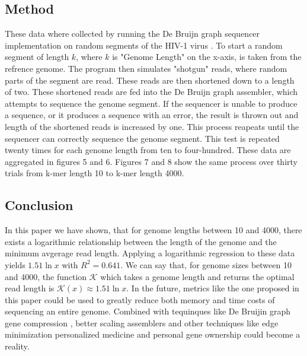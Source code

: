 \documentclass[letterpaper, 10 pt]{ieeeconf}
\begin{document}
  \subsection{Method}
  These data where collected by running the De Bruijn graph sequencer
  implementation on random segments of the HIV-1 virus \cite{ncbi.nlm.nih.gov}.
  To start a random segment of length $k$, where $k$ is "Genome Length" on the
  x-axis, is taken from the refrence genome.  The program then simulates
  "shotgun" reads, where random parts of the segment are read.  These reads are
  then shortened down to a length of two.  These shortened reads are fed into
  the De Bruijn graph assembler, which attempts to sequence the genome segment.
  If the sequencer is unable to produce a sequence, or it produces a sequence
  with an error, the result is thrown out and length of the shortened reads is
  increased by one.  This process reapeats until the sequencer can correctly
  sequence the genome segment.  This test is repeated twenty times for each
  genome length from ten to four-hundred.  These data are aggregated in figures
  5 and 6.  Figures 7 and 8 show the same
  process over thirty trials from k-mer length 10 to k-mer length 4000.

  \subsection{Conclusion}
  In this paper we have shown, that for genome lengths between 10 and 4000,
  there exists a logarithmic relationship between the length of the genome and the
  minimum avgerage read length.  Applying a logarithmic regression to these data yields
  $1.51\ln{x}$ with $R^2 = 0.641$.  We can say that, for genome sizes between 10 and 4000,
  the function $\mathcal{K}$ which takes a genome length and returns the optimal read
  length is $\mathcal{K}(x) \approx 1.51 \ln{x}$.  In the future, metrics like the one
  proposed in this paper could be used to greatly reduce both memory and time costs of
  sequencing an entire genome.  Combined with tequinques like De Bruijin graph gene compression
  \cite{dazdomnguez2019simulating}, better scaling assemblers \cite{10.1093/bioinformatics/bty648}
  and other techniques like edge minimization \cite{baier2019edge} personalized medicine 
  and personal gene ownership could become a reality.

  \newpage

  
  
\end{document}
